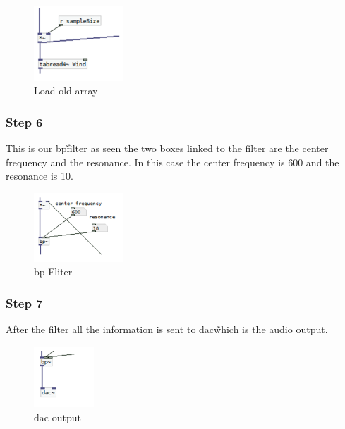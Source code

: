 \begin{figure}[!htbp]
    \centering
    \includegraphics[width=0.3\textwidth]{images/Implementation7.png}
    \caption{Load old array}
    \label{fig:implementation7}
\end{figure}



\subsubsection*{Step 6} %
\label{ssub:step_6}

This is our bp\~ filter as seen the two boxes linked to the filter are the center frequency and the resonance. 
In this case the center frequency is 600 and the resonance is 10.

\begin{figure}[!htbp]
    \centering
    \includegraphics[width=0.3\textwidth]{images/Implementation8.png}
    \caption{bp Fliter}
    \label{fig:implementation8}
\end{figure}


\FloatBarrier
\subsubsection*{Step 7} %
\label{ssub:step_7}

After the filter all the information is sent to dac\~ which is the audio output.

\begin{figure}[!htbp]
    \centering
    \includegraphics[width=0.2\textwidth]{images/Implementation9.png}
    \caption{dac output}
    \label{fig:implementation9}
\end{figure}

